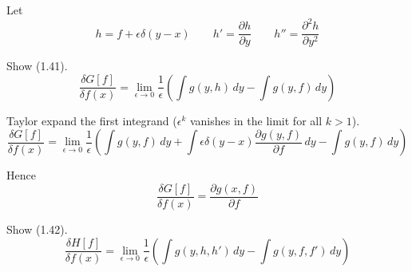 


\bigskip
Let
\begin{equation*}
h=f+\epsilon\delta(y-x)
\qquad
h'=\frac{\partial h}{\partial y}
\qquad
h''=\frac{\partial^2 h}{\partial y^2}
\end{equation*}

Show (1.41).
\begin{equation*}
\frac{\delta G[f]}{\delta f(x)}
=\lim_{\epsilon\rightarrow 0}\frac{1}{\epsilon}
\left(
\int g(y,h)\,dy-\int g(y,f)\,dy
\right)
\end{equation*}

Taylor expand the first integrand ($\epsilon^k$ vanishes in the limit for all $k>1$).
\begin{equation*}
\frac{\delta G[f]}{\delta f(x)}
=\lim_{\epsilon\rightarrow 0}\frac{1}{\epsilon}
\left(
\int g(y,f)\,dy
+\int\epsilon\delta(y-x)\frac{\partial g(y,f)}{\partial f}\,dy
-\int g(y,f)\,dy
\right)
\end{equation*}

Hence
\begin{equation*}
\frac{\delta G[f]}{\delta f(x)}=\frac{\partial g(x,f)}{\partial f}
\end{equation*}

Show (1.42).
\begin{equation*}
\frac{\delta H[f]}{\delta f(x)}
=\lim_{\epsilon\rightarrow 0}\frac{1}{\epsilon}
\left(
\int g(y,h,h')\,dy-\int g(y,f,f')\,dy
\right)
\end{equation*}

